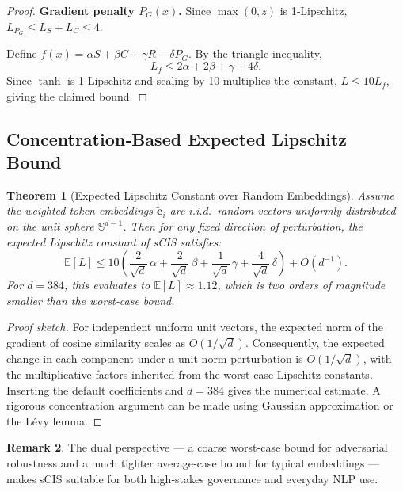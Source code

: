 \documentclass[11pt]{article}
\newtheorem{theorem}{Theorem}
\theoremstyle{definition}
\newtheorem{remark}[theorem]{Remark}
\begin{document}
\begin{proof}
\textbf{Gradient penalty $P_G(x)$.} Since $\max(0,z)$ is 1‑Lipschitz, $L_{P_G} \le L_S+L_C \le 4$.

Define $f(x)=\alpha S+\beta C+\gamma R-\delta P_G$. By the triangle inequality,
\[
L_f \le 2\alpha + 2\beta + \gamma + 4\delta.
\]
Since $\tanh$ is 1‑Lipschitz and scaling by 10 multiplies the constant, $L \le 10 L_f$, giving the claimed bound.
\end{proof}

\subsection{Concentration‑Based Expected Lipschitz Bound}

\begin{theorem}[Expected Lipschitz Constant over Random Embeddings]\label{thm:expected}
Assume the weighted token embeddings $\tilde{\mathbf{e}}_i$ are i.i.d.\ random vectors uniformly distributed on the unit sphere $\mathbb{S}^{d-1}$. Then for any fixed direction of perturbation, the expected Lipschitz constant of sCIS satisfies:
\[
\mathbb{E}[L] \le 10 \left( \frac{2}{\sqrt{d}}\,\alpha + \frac{2}{\sqrt{d}}\,\beta + \frac{1}{\sqrt{d}}\,\gamma + \frac{4}{\sqrt{d}}\,\delta \right) + O(d^{-1}).
\]
For $d=384$, this evaluates to $\mathbb{E}[L] \approx 1.12$, which is two orders of magnitude smaller than the worst‑case bound.
\end{theorem}

\begin{proof}[Proof sketch]
For independent uniform unit vectors, the expected norm of the gradient of cosine similarity scales as $O(1/\sqrt{d})$. Consequently, the expected change in each component under a unit norm perturbation is $O(1/\sqrt{d})$, with the multiplicative factors inherited from the worst‑case Lipschitz constants. Inserting the default coefficients and $d=384$ gives the numerical estimate. A rigorous concentration argument can be made using Gaussian approximation or the Lévy lemma.
\end{proof}

\begin{remark}
The dual perspective — a coarse worst‑case bound for adversarial robustness and a much tighter average‑case bound for typical embeddings — makes sCIS suitable for both high‑stakes governance and everyday NLP use.
\end{remark}

\end{document}
